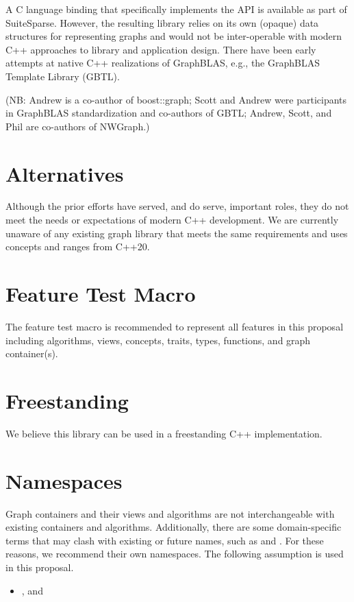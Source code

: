 A C language binding that specifically implements the API is available as part of SuiteSparse.
However, the resulting library relies on its own (opaque) data structures for representing graphs
and would not be inter-operable with modern C++ approaches to library and application design.
There have been early attempts at native C++ realizations of GraphBLAS, e.g., the
GraphBLAS Template Library (GBTL).

(NB: Andrew is a co-author of boost::graph; 
Scott and Andrew were participants in GraphBLAS standardization
and co-authors of GBTL; Andrew, Scott, and Phil are 
co-authors of NWGraph.)

\section{Alternatives}
Although the prior efforts have served, and do serve, important roles,
they do not meet the needs or expectations of modern C++ development.
We are currently
unaware of any existing graph
library that meets the same requirements and uses concepts and ranges from C++20.


\section{Feature Test Macro}
The  feature test macro is recommended to represent all features in this proposal including algorithms, views, concepts, traits, types, functions, and graph container(s).

\section{Freestanding}
We believe this library can be used in a freestanding C++ implementation.

\section{Namespaces}
Graph containers and their views and algorithms are not interchangeable with existing containers and algorithms.
Additionally, there are some domain-specific terms that may clash with existing or future names, such as 
 and .
For these reasons, we recommend their own namespaces. The following assumption is used in this proposal.
\begin{itemize}
\item[],  and 
\end{itemize}

